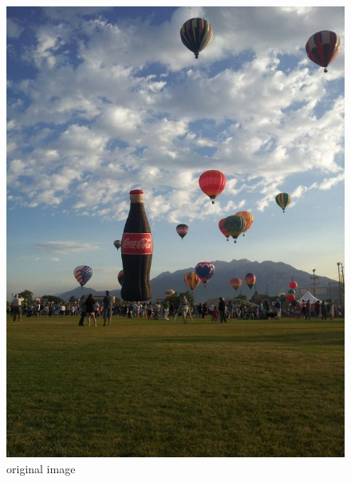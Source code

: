 \begin{figure}[ht]
\begin{minipage}[b]{0.45\linewidth}
\centering
\includegraphics[width=\textwidth]{baloon_resized_color.jpg}
\caption*{original image}
\end{minipage}
\hspace{0.5cm}
\begin{minipage}[b]{0.45\linewidth}
\centering

\end{minipage}
\end{figure}
